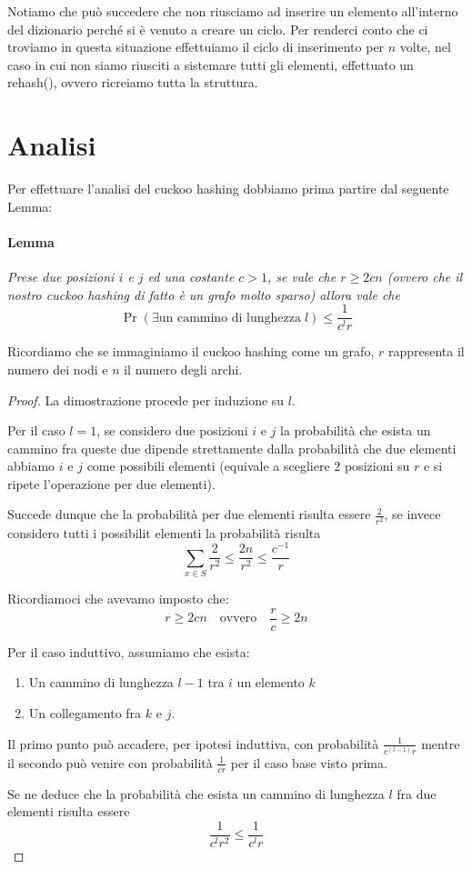 \documentclass[a4paper,11pt]{book}
\begin{document}
Notiamo che pu\`o succedere che non riusciamo ad inserire un elemento all'interno del dizionario perch\'e si \`e venuto a creare un ciclo. Per renderci conto che ci troviamo in questa situazione effettuiamo il ciclo di inserimento per $n$ volte, nel caso in cui non siamo riusciti a sistemare tutti gli elementi, effettuato un \textsf{rehash()}, ovvero ricreiamo tutta la struttura.

\section{Analisi}

Per effettuare l'analisi del cuckoo hashing dobbiamo prima partire dal seguente Lemma:

\paragraph{Lemma} \emph{Prese due posizioni $i$ e $j$ ed una costante $c > 1$, se vale che $r \geq 2cn$ (ovvero che il nostro cuckoo hashing di fatto \`e un grafo molto sparso) allora vale che $$ \Pr(\exists \mbox{un cammino di lunghezza} \; l) \leq \frac{1}{c^{l}r}$$}

Ricordiamo che se immaginiamo il cuckoo hashing come un grafo, $r$ rappresenta il numero dei nodi e $n$ il numero degli archi.

\begin{proof}
La dimostrazione procede per induzione su $l$.

Per il caso $l=1$, se considero due posizioni $i$ e $j$ la probabilit\`a che esista un cammino fra queste due dipende strettamente dalla probabilit\`a che due elementi abbiamo $i$ e $j$ come possibili elementi (equivale a scegliere 2 posizioni su $r$ e si ripete l'operazione per due elementi).

Succede dunque che la probabilit\`a per due elementi risulta essere $\frac{2}{r^2}$, se invece considero tutti i possibilit elementi la probabilit\`a risulta $$\sum_{x \in S} \frac{2}{r^2} \leq \frac{2n}{r^2} \leq \frac{c^{-1}}{r}$$

Ricordiamoci che avevamo imposto che:$$r \geq 2cn \quad \mbox{ovvero} \quad \frac{r}{c} \geq 2n$$

Per il caso induttivo, assumiamo che esista:
\begin{enumerate}
\item Un cammino di lunghezza $l-1$ tra $i$ un elemento $k$
\item Un collegamento fra $k$ e $j$.
\end{enumerate}
Il primo punto pu\`o accadere, per ipotesi induttiva, con probabilit\`a $\frac{1}{c^{(l-1)}r}$ mentre il secondo pu\`o venire con probabilit\`a $\frac{1}{cr}$ per il caso base visto prima.

Se ne deduce che la probabilit\`a che esista un cammino di lunghezza $l$ fra due elementi risulta essere $$\frac{1}{c^l r^2} \leq \frac{1}{c^l r}$$
\end{proof}
\end{document}
